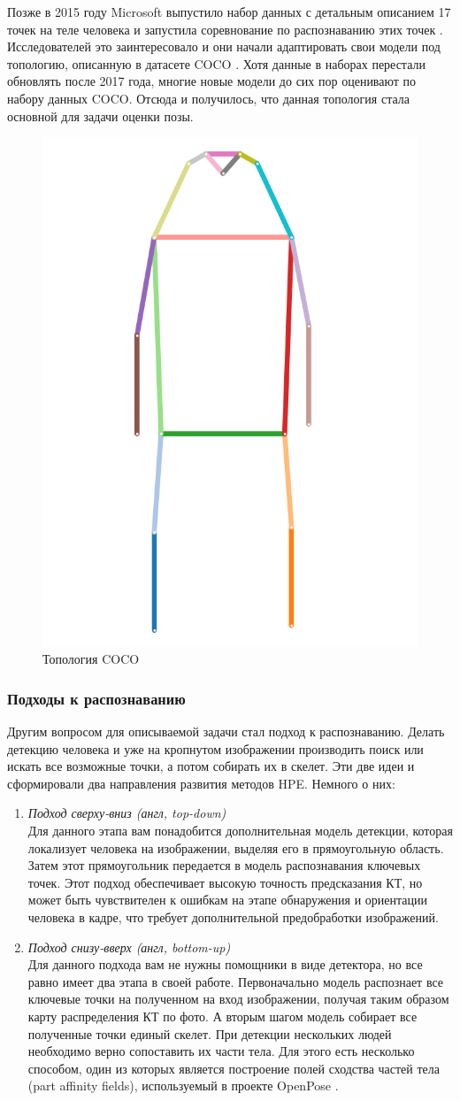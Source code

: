 Позже в 2015 году Microsoft выпустило набор данных с детальным описанием 17 точек на теле человека и запустила соревнование по распознаванию этих точек \cite{COCO_dataset, COCO_topology}. Исследователей это заинтересовало и они начали адаптировать свои модели под топологию, описанную в датасете COCO \cite{COCO_dataset}. Хотя данные в наборах перестали обновлять после 2017 года, многие новые модели до сих пор оценивают по набору данных COCO. Отсюда и получилось, что данная топология стала основной для задачи оценки позы.

\begin{figure}[h]
	\centering
	\includegraphics[width=.3\textwidth]{./images/coco_topology.png}
	\caption{Топология COCO}
	\label{fig:coco_topology}
\end{figure}

\subsubsection*{Подходы к распознаванию}

Другим вопросом для описываемой задачи стал подход к распознаванию. Делать детекцию человека и уже на кропнутом изображении производить поиск или искать все возможные точки, а потом собирать их в скелет. Эти две идеи и сформировали два направления развития методов HPE. Немного о них:
\begin{enumerate}
	\item \textit{Подход сверху-вниз (англ, top-down)}\\
	Для данного этапа вам понадобится дополнительная модель детекции, которая локализует человека на изображении, выделяя его в прямоугольную область. Затем этот прямоугольник передается в модель распознавания ключевых точек. Этот подход обеспечивает высокую точность предсказания КТ, но может быть чувствителен к ошибкам на этапе обнаружения и ориентации человека в кадре, что требует дополнительной предобработки изображений.
	\item \textit{Подход снизу-вверх (англ, bottom-up)}\\
	Для данного подхода вам не нужны помощники в виде детектора, но все равно имеет два этапа в своей работе. Первоначально модель распознает все ключевые точки на полученном на вход изображении, получая таким образом карту распределения КТ по фото. А вторым шагом модель собирает все полученные точки единый скелет. При детекции нескольких людей необходимо верно сопоставить их части тела. Для этого есть несколько способом, один из которых является построение полей сходства частей тела (part affinity fields), используемый в проекте OpenPose \cite{OpenPose}.
\end{enumerate}


